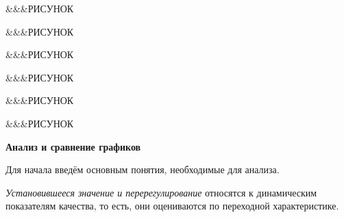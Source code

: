 \begin{par}
\begin{flushleft}
\&\&\&РИСУНОК
\end{flushleft}
\end{par}

\begin{par}
\begin{flushleft}
\&\&\&РИСУНОК
\end{flushleft}
\end{par}

\begin{par}
\begin{flushleft}
\&\&\&РИСУНОК
\end{flushleft}
\end{par}

\begin{par}
\begin{flushleft}
\&\&\&РИСУНОК
\end{flushleft}
\end{par}

\begin{par}
\begin{flushleft}
\&\&\&РИСУНОК
\end{flushleft}
\end{par}

\begin{par}
\begin{flushleft}
\&\&\&РИСУНОК
\end{flushleft}
\end{par}

\begin{par}
\begin{flushleft}
\textbf{Анализ и сравнение графиков}
\end{flushleft}
\end{par}

\begin{par}
\begin{flushleft}
Для начала введём основным понятия, необходимые для анализа.
\end{flushleft}
\end{par}

\begin{par}
\begin{flushleft}
\textit{Установившееся значение и перерегулирование} относятся к динамическим показателям качества, то есть, они оцениваются по переходной характеристике.
\end{flushleft}
\end{par}

